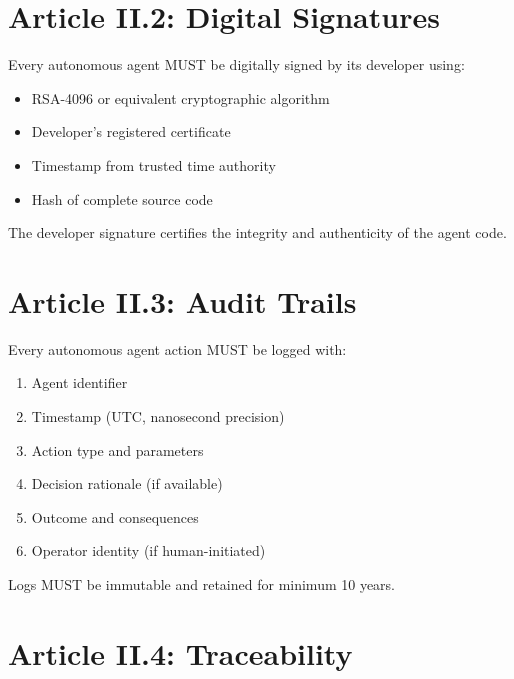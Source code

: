 \vspace{0.5cm}

\section{Article II.2: Digital Signatures}

\begin{articlebox}
Every autonomous agent MUST be digitally signed by its developer using:
\begin{itemize}
    \item RSA-4096 or equivalent cryptographic algorithm
    \item Developer's registered certificate
    \item Timestamp from trusted time authority
    \item Hash of complete source code
\end{itemize}

The developer signature certifies the integrity and authenticity of the agent code.
\end{articlebox}

\vspace{0.5cm}

\section{Article II.3: Audit Trails}

\begin{articlebox}
Every autonomous agent action MUST be logged with:
\begin{enumerate}
    \item Agent identifier
    \item Timestamp (UTC, nanosecond precision)
    \item Action type and parameters
    \item Decision rationale (if available)
    \item Outcome and consequences
    \item Operator identity (if human-initiated)
\end{enumerate}

Logs MUST be immutable and retained for minimum 10 years.
\end{articlebox}

\vspace{0.5cm}

\section{Article II.4: Traceability}

